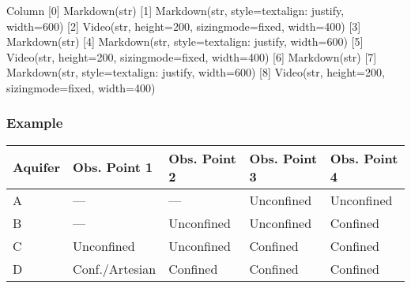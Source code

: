 \documentclass[letterpaper,10pt,english]{sphinxmanual}
\begin{document}
\begin{sphinxVerbatim}[commandchars=\\\{\}]
      

         
\end{sphinxVerbatim}

\begin{sphinxVerbatim}[commandchars=\\\{\}]
Column
    [0] Markdown(str)
    [1] Markdown(str, style=\PYGZob{}\PYGZsq{}text\PYGZhy{}align\PYGZsq{}: \PYGZsq{}justify\PYGZsq{}\PYGZcb{}, width=600)
    [2] Video(str, height=200, sizing\PYGZus{}mode=\PYGZsq{}fixed\PYGZsq{}, width=400)
    [3] Markdown(str)
    [4] Markdown(str, style=\PYGZob{}\PYGZsq{}text\PYGZhy{}align\PYGZsq{}: \PYGZsq{}justify\PYGZsq{}\PYGZcb{}, width=600)
    [5] Video(str, height=200, sizing\PYGZus{}mode=\PYGZsq{}fixed\PYGZsq{}, width=400)
    [6] Markdown(str)
    [7] Markdown(str, style=\PYGZob{}\PYGZsq{}text\PYGZhy{}align\PYGZsq{}: \PYGZsq{}justify\PYGZsq{}\PYGZcb{}, width=600)
    [8] Video(str, height=200, sizing\PYGZus{}mode=\PYGZsq{}fixed\PYGZsq{}, width=400)
\end{sphinxVerbatim}


\subsubsection{Example}
\label{\detokenize{contents/flow/lecture_03/13_gw_storage:example}}

\begin{savenotes}\sphinxattablestart
\centering
\begin{tabulary}{\linewidth}[t]{|T|T|T|T|T|}
\hline
\sphinxstyletheadfamily 
Aquifer
&\sphinxstyletheadfamily 
Obs. Point 1
&\sphinxstyletheadfamily 
Obs. Point 2
&\sphinxstyletheadfamily 
Obs. Point 3
&\sphinxstyletheadfamily 
Obs. Point 4
\\
\hline
A
&
—
&
—
&
Unconfined
&
Unconfined
\\
\hline
B
&
—
&
Unconfined
&
Unconfined
&
Confined
\\
\hline
C
&
Unconfined
&
Unconfined
&
Confined
&
Confined
\\
\hline
D
&
Conf./Artesian
&
Confined
&
Confined
&
Confined
\\
\hline
\end{tabulary}
\par
\sphinxattableend\end{savenotes}
\end{document}

